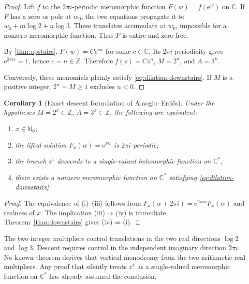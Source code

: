 \documentclass[11pt,oneside]{article}
\newtheorem{corollary}[theorem]{Corollary}
\theoremstyle{definition}
\theoremstyle{remark}
\newcommand{\Nzero}{\mathbb N_0}
\newcommand{\Z}{\mathbb Z}
\newcommand{\C}{\mathbb C}
\newcommand{\e}{\mathrm e}
\newcommand{\AEconj}{Alaoglu--Erd\H{o}s}
\begin{document}
\begin{proof}
Lift \(f\) to the \(2\pi i\)-periodic meromorphic function
\(F(w)=f(\e^w)\) on \(\C\).  If \(F\) has a zero or pole at \(w_0\), the two equations propagate it to
\(w_0+m\log2+n\log3\).  These translates accumulate at \(w_0\), impossible for a nonzero meromorphic function.  Thus \(F\) is entire and zero-free.

By \cref{thm:upstairs}, \(F(w)=C\e^{cw}\) for some \(c\in\C\).  Its \(2\pi i\)-periodicity gives
\(\e^{2\pi i c}=1\), hence \(c=n\in\Z\).  Therefore
\(f(z)=Cz^n\), \(M=2^n\), and \(A=3^n\).

Conversely, these monomials plainly satisfy \eqref{eq:dilation-downstairs}.  If \(M\) is a positive integer, \(2^n=M\ge1\) excludes \(n<0\).
\end{proof}

\begin{corollary}[Exact descent formulation of \AEconj]
\label{cor:descent-equivalence}
Under the hypotheses \(M=2^x\in\Z\), \(A=3^x\in\Z\), the following are equivalent:
\begin{enumerate}[label=(\roman*)]
\item \(x\in\Nzero\);
\item the lifted solution \(F_x(w)=\e^{xw}\) is \(2\pi i\)-periodic;
\item the branch \(z^x\) descends to a single-valued holomorphic function on \(\C^*\);
\item there exists a nonzero meromorphic function on \(\C^*\) satisfying \eqref{eq:dilation-downstairs}.
\end{enumerate}
\end{corollary}

\begin{proof}
The equivalence of (i)--(iii) follows from
\(F_x(w+2\pi i)=\e^{2\pi ix}F_x(w)\) and realness of \(x\).  The implication (iii)\(\Rightarrow\)(iv) is immediate.  Theorem~\ref{thm:downstairs} gives (iv)\(\Rightarrow\)(i).
\end{proof}

\begin{gapbox}
The two integer multipliers control translations in the two real directions \(\log2\) and \(\log3\).  Descent requires control in the independent imaginary direction \(2\pi i\).  No known theorem derives that vertical monodromy from the two arithmetic real multipliers.  Any proof that silently treats \(z^x\) as a single-valued meromorphic function on \(\C^*\) has already assumed the conclusion.
\end{gapbox}
\end{document}
